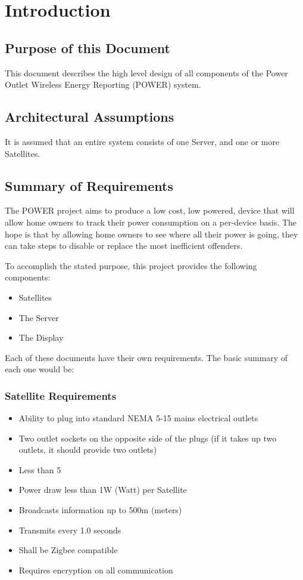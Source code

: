 \chapter{Introduction}

\section{Purpose of this Document}
This document describes the high level design of all components of the Power Outlet Wireless Energy Reporting (POWER) system.

\section{Architectural Assumptions}
It is assumed that an entire system consists of one Server, and one or more Satellites.

\section{Summary of Requirements}
The POWER project aims to produce a low cost, low powered, device that will allow home owners to track their power consumption on a per-device basis. The hope is that by allowing home owners to see where all their power is going, they can take steps to disable or replace the most inefficient offenders.

To accomplish the stated purpose, this project provides the following components:
\begin{itemize}
 \item Satellites
 \item The Server
 \item The Display
\end{itemize}

Each of these documents have their own requirements. The basic summary of each one would be:

\subsection{Satellite Requirements}
\begin{itemize}
 \item Ability to plug into standard NEMA 5-15 mains electrical outlets
 \item Two outlet sockets on the opposite side of the plugs (if it takes up two outlets, it should provide two outlets)
 \item Less than 5%
 \item Power draw less than 1W (Watt) per Satellite
 \item Broadcasts information up to 500m (meters)
 \item Transmits every 1.0 seconds
 \item Shall be Zigbee compatible
 \item Requires encryption on all communication
\end{itemize}

